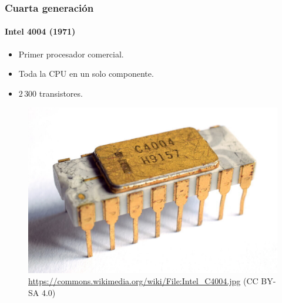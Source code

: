 \documentclass[11pt,a4paper,spanish]{beamer}
\begin{document}
\begin{frame}

\frametitle{Cuarta generación}
\framesubtitle{Intel 4004 (1971)}

\begin{itemize}
    \item Primer procesador comercial.
    \item Toda la CPU en un solo componente.
    \item $2\,300$ transistores.
\end{itemize}

\begin{figure}
    \includegraphics[height=0.5\textheight]{img/intelC4004.jpg}
    \captionsetup{textfont=tiny,labelformat=empty}
    \caption{\url{https://commons.wikimedia.org/wiki/File:Intel\_C4004.jpg}
        (CC BY-SA 4.0)}
\end{figure}

\end{frame}
\end{document}
